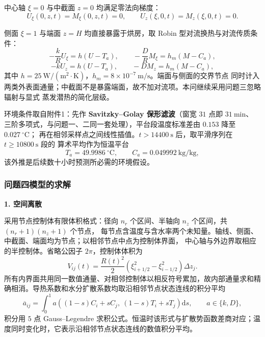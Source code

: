 \documentclass[12pt,a4paper]{ctexart}
\begin{document}
中心轴 $\xi=0$ 与中截面 $z=0$ 均满足零法向梯度：
\begin{equation}
U_\xi(0,z,t)=M_\xi(0,z,t)=0,\qquad U_z(\xi,0,t)=M_z(\xi,0,t)=0 .
\label{eq:p4sym}
\end{equation}

侧面 $\xi=1$ 与端面 $z=H$ 均直接暴露于烘房，取 Robin 型对流换热与对流传质条件：
\begin{equation}
-\frac{k}{R}U_\xi=h\left(U-T_a\right),\qquad
-\frac{D}{R}M_\xi=h_m\left(M-C_a\right),
\label{eq:p4bcside}
\end{equation}
\begin{equation}
-kU_z=h\left(U-T_a\right),\qquad
-DM_z=h_m\left(M-C_a\right),
\label{eq:p4bcend}
\end{equation}
其中 $h=25\ \mathrm{W/(m^2\cdot K)}$，$h_m=8\times10^{-7}\ \mathrm{m/s}$。端面与侧面的交界节点
同时计入两类外表面通量；中截面不是暴露端面，故不加对流项。本问继续采用问题三忽略辐射与显式
蒸发潜热的简化层级。

环境条件取自附件1：先作 \textbf{Savitzky--Golay 保形滤波}（窗宽 $31$ 点即 $31\ \mathrm{min}$、
三阶多项式，与问题一、二同一套处理），平台段温度标准差由 $0.153$ 降至 $0.027\ ^\circ\mathrm{C}$；
再在相邻采样点之间线性插值。$t>14400\ \mathrm{s}$ 后，取平滑序列在 $t\ge10800\ \mathrm{s}$ 段的
算术平均作为恒温平台
\begin{equation}
T_a=49.9986\ ^\circ\mathrm{C},\qquad C_a=0.049992\ \mathrm{kg/kg},
\label{eq:p4plateau}
\end{equation}
该外推是后续数十小时预测所必需的环境假设。

\subsubsection{问题四模型的求解}

\textbf{1. 空间离散}

采用节点控制体有限体积格式：径向 $n_r$ 个区间、半轴向 $n_z$ 个区间，共 $(n_r+1)(n_z+1)$ 个节点，
每节点含温度与含水率两个未知量。轴线、侧面、中截面、端面均为节点；以相邻节点中点为控制体界面，
中心轴与外边界取相应的半控制体。省略公因子 $2\pi$，控制体体积为
\begin{equation}
V_{ij}(t)=\frac{R(t)^{2}}{2}\left(\xi_{i+1/2}^{2}-\xi_{i-1/2}^{2}\right)\Delta z_j .
\label{eq:p4volume}
\end{equation}
所有内界面共用同一数值通量、对相邻控制体以相反符号累加，故内部通量求和精确相消。导热系数和水分扩散系数均取沿相邻节点状态连线的积分平均
\begin{equation}
\overline a_{ij}=\int_0^1 a\!\left((1-s)C_i+sC_j,\ (1-s)T_i+sT_j\right)\mathrm{d}s,
\qquad
 a\in\{k,D\},
\label{eq:p4kirchhoff}
\end{equation}
积分用 $5$ 点 Gauss--Legendre 求积公式。恒温时该形式与扩散势函数差商对应；温度同时变化时，它表示沿相邻节点状态连线的数值积分平均。
\end{document}
